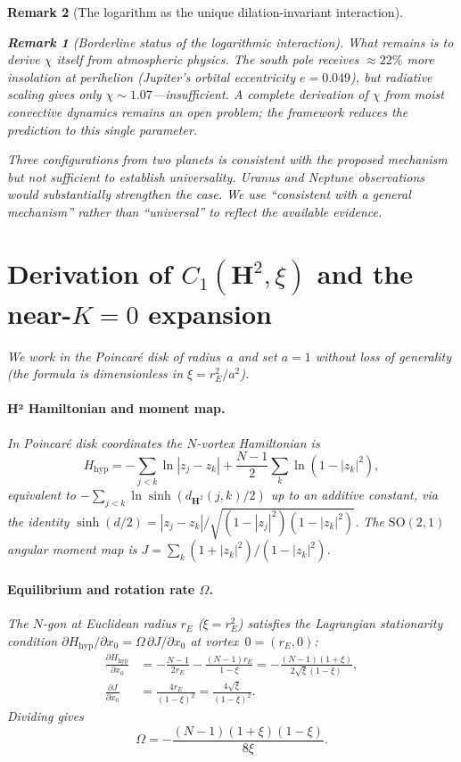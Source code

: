 \documentclass[12pt, a4paper]{article}
\newtheorem{remark}{Remark}[section]
\numberwithin{equation}{section}
\begin{document}
\begin{remark}[The logarithm as the unique dilation-invariant interaction]
\begin{remark}[Borderline status of the logarithmic interaction]
What remains is to derive $\chi$ itself from atmospheric physics.
The south pole receives $\approx 22\%$ more insolation at perihelion
(Jupiter's orbital eccentricity $e = 0.049$), but radiative scaling
gives only $\chi \sim 1.07$---insufficient.  A complete derivation
of $\chi$ from moist convective dynamics remains an open problem;
the framework reduces the prediction to this single parameter.

Three configurations from two planets is consistent with the proposed
mechanism but not sufficient to establish universality.  Uranus and
Neptune observations would substantially strengthen the case.  We use
``consistent with a general mechanism'' rather than ``universal'' to
reflect the available evidence.


\appendix

\section{Derivation of $C_1(\mathbf{H}^2,\xi)$ and the near-$K=0$ expansion}
\label{app:c1_h2}

We work in the Poincar\'e disk of radius~$a$ and set $a = 1$ without
loss of generality (the formula is dimensionless in $\xi = r_E^2/a^2$).

\paragraph{H² Hamiltonian and moment map.}
In Poincar\'e disk coordinates the $N$-vortex Hamiltonian is
\citep{Kimura1999}
\begin{equation}\label{eq:H_hyp}
  H_{\mathrm{hyp}} = -\!\sum_{j<k}\ln|z_j - z_k|
    + \frac{N-1}{2}\sum_k \ln(1 - |z_k|^2),
\end{equation}
equivalent to $-\sum_{j<k}\ln\sinh(d_{\mathbf{H}^2}(j,k)/2)$ up to
an additive constant, via the identity
$\sinh(d/2) = |z_j - z_k|/\sqrt{(1-|z_j|^2)(1-|z_k|^2)}$.
The $\mathrm{SO}(2,1)$ angular moment map is
$J = \sum_k(1+|z_k|^2)/(1-|z_k|^2)$.

\paragraph{Equilibrium and rotation rate $\Omega$.}
The $N$-gon at Euclidean radius $r_E$ ($\xi = r_E^2$) satisfies the
Lagrangian stationarity condition $\partial H_{\mathrm{hyp}}/\partial x_0
= \Omega\,\partial J/\partial x_0$ at vortex~$0 = (r_E, 0)$:
\begin{align*}
  \frac{\partial H_{\mathrm{hyp}}}{\partial x_0}
    &= -\frac{N-1}{2r_E} - \frac{(N-1)r_E}{1-\xi}
     = -\frac{(N-1)(1+\xi)}{2\sqrt{\xi}(1-\xi)}, \\
  \frac{\partial J}{\partial x_0}
    &= \frac{4r_E}{(1-\xi)^2}
     = \frac{4\sqrt{\xi}}{(1-\xi)^2}.
\end{align*}
Dividing gives
\begin{equation}\label{eq:Omega_H2}
  \Omega = -\frac{(N-1)(1+\xi)(1-\xi)}{8\xi}.
\end{equation}


\end{remark}
\end{remark}
\end{document}
